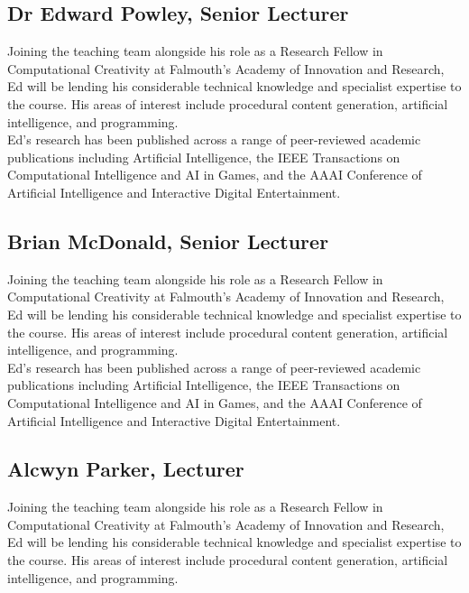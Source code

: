\documentclass[10pt, a5paper, twoside, openright, titlepage]{memoir}\usepackage{etoolbox}\newtoggle{printable}\toggletrue{printable}\newtoggle{isBeamer}\togglefalse{isBeamer}
\begin{document}
\subsection{Dr Edward Powley, Senior Lecturer}

Joining the teaching team alongside his role as a Research Fellow in Computational Creativity at Falmouth's Academy of Innovation and Research, Ed will be lending his considerable technical knowledge and specialist expertise to the course. His areas of interest include procedural content generation, artificial intelligence, and programming. \\

Ed's research has been published across a range of peer-reviewed academic publications including Artificial Intelligence, the IEEE Transactions on Computational Intelligence and AI in Games, and the AAAI Conference of Artificial Intelligence and Interactive Digital Entertainment. \\

\subsection{Brian McDonald, Senior Lecturer}

Joining the teaching team alongside his role as a Research Fellow in Computational Creativity at Falmouth's Academy of Innovation and Research, Ed will be lending his considerable technical knowledge and specialist expertise to the course. His areas of interest include procedural content generation, artificial intelligence, and programming. \\

Ed's research has been published across a range of peer-reviewed academic publications including Artificial Intelligence, the IEEE Transactions on Computational Intelligence and AI in Games, and the AAAI Conference of Artificial Intelligence and Interactive Digital Entertainment. \\

\subsection{Alcwyn Parker, Lecturer}

Joining the teaching team alongside his role as a Research Fellow in Computational Creativity at Falmouth's Academy of Innovation and Research, Ed will be lending his considerable technical knowledge and specialist expertise to the course. His areas of interest include procedural content generation, artificial intelligence, and programming. \\
\end{document}
